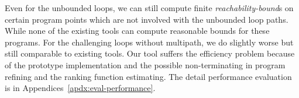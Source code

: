 Even for the unbounded loops, we can still compute finite \emph{reachability-bound}s on certain program points which are not involved with the unbounded loop paths.
While none of the existing tools can compute reasonable bounds for these programs.
For the challenging loops without multipath, we do slightly worse but still comparable to existing tools.
Our tool suffers the efficiency problem because of the prototype implementation and the possible non-terminating in program refining and the ranking function estimating.
The detail performance evaluation is in Appendices~\ref{apdx:eval-performance}.
